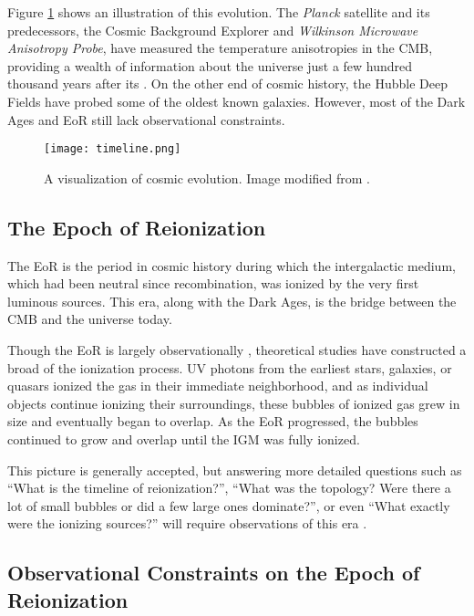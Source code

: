 \documentclass[12pt]{article}
\begin{document}
Figure \ref{fig:timeline} shows an illustration of this evolution. The \textit{Planck} satellite and its predecessors, the Cosmic Background Explorer \note{[LW: italicize?]} and \textit{Wilkinson Microwave Anisotropy Probe}, have measured the temperature anisotropies in the CMB, providing a wealth of information about the universe just a few hundred thousand years after its . On the other end of cosmic history, the Hubble Deep Fields have probed some of the oldest known galaxies. However, most of the Dark Ages and EoR still lack observational constraints.

\begin{figure}[tb]
	\centering
	\texttt{[image: timeline.png]}
	\caption[History of the universe]{A visualization of cosmic evolution. Image modified from \cite{loeb2006}.}
	\label{fig:timeline}
\end{figure}

\subsection{The Epoch of Reionization} \label{subsec:eor}

The EoR is the period in cosmic history during which the intergalactic medium, which had been neutral since recombination, was ionized by the very first luminous sources. This era, along with the Dark Ages, is the bridge between  the CMB and the universe today.

Though the EoR is largely observationally , theoretical studies have constructed a broad  of the ionization process. UV photons from the earliest stars, galaxies, or quasars ionized the gas in their immediate neighborhood, and as individual objects continue ionizing their surroundings, these bubbles of ionized gas grew in size and eventually began to overlap. As the EoR progressed, the bubbles continued to grow and overlap until the IGM was fully ionized.

This  picture is generally accepted, but answering more detailed questions such as ``What is the timeline of reionization?'', ``What was the topology? Were there a lot of small bubbles or did a few large ones dominate?'', or even ``What exactly were the ionizing sources?'' will require observations of this era .

\subsection{Observational Constraints on the Epoch of Reionization} \label{subsec:probes}
\end{document}
